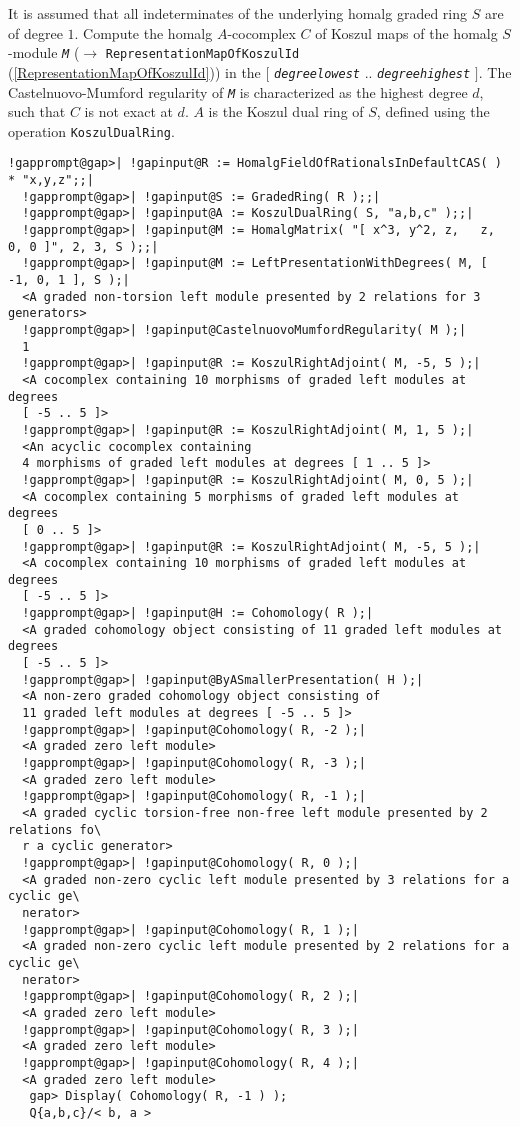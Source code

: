 \documentclass[a4paper,11pt]{report}
\begin{document}
{{{ It is assumed that all indeterminates of the underlying \textsf{homalg} graded ring $S$ are of degree $1$. Compute the \textsf{homalg} $A$-cocomplex $C$ of Koszul maps of the \textsf{homalg} $S$-module \mbox{\texttt{\mdseries\slshape M}} ($\to$ \texttt{RepresentationMapOfKoszulId} (\ref{RepresentationMapOfKoszulId})) in the $[$ \mbox{\texttt{\mdseries\slshape degree{\textunderscore}lowest}} .. \mbox{\texttt{\mdseries\slshape degree{\textunderscore}highest}} $]$. The Castelnuovo-Mumford regularity of \mbox{\texttt{\mdseries\slshape M}} is characterized as the highest degree $d$, such that $C$ is not exact at $d$. $A$ is the Koszul dual ring of $S$, defined using the operation \texttt{KoszulDualRing}. 
\begin{Verbatim}[commandchars=!@|,fontsize=\small,frame=single,label=Example]
  !gapprompt@gap>| !gapinput@R := HomalgFieldOfRationalsInDefaultCAS( ) * "x,y,z";;|
  !gapprompt@gap>| !gapinput@S := GradedRing( R );;|
  !gapprompt@gap>| !gapinput@A := KoszulDualRing( S, "a,b,c" );;|
  !gapprompt@gap>| !gapinput@M := HomalgMatrix( "[ x^3, y^2, z,   z, 0, 0 ]", 2, 3, S );;|
  !gapprompt@gap>| !gapinput@M := LeftPresentationWithDegrees( M, [ -1, 0, 1 ], S );|
  <A graded non-torsion left module presented by 2 relations for 3 generators>
  !gapprompt@gap>| !gapinput@CastelnuovoMumfordRegularity( M );|
  1
  !gapprompt@gap>| !gapinput@R := KoszulRightAdjoint( M, -5, 5 );|
  <A cocomplex containing 10 morphisms of graded left modules at degrees
  [ -5 .. 5 ]>
  !gapprompt@gap>| !gapinput@R := KoszulRightAdjoint( M, 1, 5 );|
  <An acyclic cocomplex containing
  4 morphisms of graded left modules at degrees [ 1 .. 5 ]>
  !gapprompt@gap>| !gapinput@R := KoszulRightAdjoint( M, 0, 5 );|
  <A cocomplex containing 5 morphisms of graded left modules at degrees
  [ 0 .. 5 ]>
  !gapprompt@gap>| !gapinput@R := KoszulRightAdjoint( M, -5, 5 );|
  <A cocomplex containing 10 morphisms of graded left modules at degrees
  [ -5 .. 5 ]>
  !gapprompt@gap>| !gapinput@H := Cohomology( R );|
  <A graded cohomology object consisting of 11 graded left modules at degrees 
  [ -5 .. 5 ]>
  !gapprompt@gap>| !gapinput@ByASmallerPresentation( H );|
  <A non-zero graded cohomology object consisting of
  11 graded left modules at degrees [ -5 .. 5 ]>
  !gapprompt@gap>| !gapinput@Cohomology( R, -2 );|
  <A graded zero left module>
  !gapprompt@gap>| !gapinput@Cohomology( R, -3 );|
  <A graded zero left module>
  !gapprompt@gap>| !gapinput@Cohomology( R, -1 );|
  <A graded cyclic torsion-free non-free left module presented by 2 relations fo\
  r a cyclic generator>
  !gapprompt@gap>| !gapinput@Cohomology( R, 0 );|
  <A graded non-zero cyclic left module presented by 3 relations for a cyclic ge\
  nerator>
  !gapprompt@gap>| !gapinput@Cohomology( R, 1 );|
  <A graded non-zero cyclic left module presented by 2 relations for a cyclic ge\
  nerator>
  !gapprompt@gap>| !gapinput@Cohomology( R, 2 );|
  <A graded zero left module>
  !gapprompt@gap>| !gapinput@Cohomology( R, 3 );|
  <A graded zero left module>
  !gapprompt@gap>| !gapinput@Cohomology( R, 4 );|
  <A graded zero left module>
   gap> Display( Cohomology( R, -1 ) );
   Q{a,b,c}/< b, a >
   

\end{Verbatim}}}}
\end{document}
